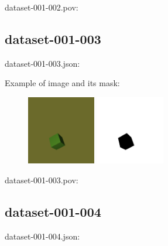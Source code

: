 dataset-001-002.pov:
\begin{scriptsize}
\begin{ttfamily}

\end{ttfamily}
\end{scriptsize}

\subsection{dataset-001-003}

dataset-001-003.json:
\begin{scriptsize}
\begin{ttfamily}

\end{ttfamily}
\end{scriptsize}

Example of image and its mask:
\begin{center}
\begin{figure}[H]
\centering\includegraphics[width=3cm]{./img-001-003.png}
\centering\includegraphics[width=3cm]{./mask-001-003.png}
\end{figure}
\end{center}

dataset-001-003.pov:
\begin{scriptsize}
\begin{ttfamily}

\end{ttfamily}
\end{scriptsize}

\subsection{dataset-001-004}

dataset-001-004.json:
\begin{scriptsize}
\begin{ttfamily}

\end{ttfamily}
\end{scriptsize}

